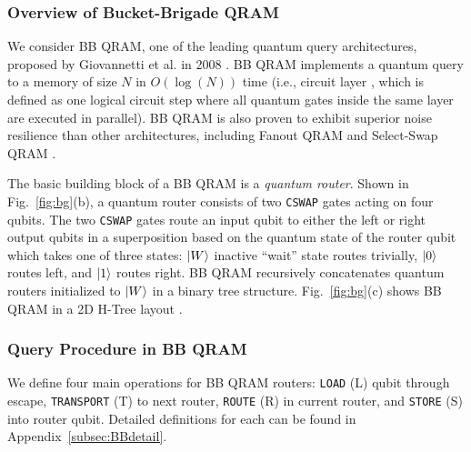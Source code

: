 \subsubsection{Overview of Bucket-Brigade QRAM}

We consider BB QRAM, one of the leading quantum query architectures, proposed by Giovannetti et al. in 2008 \cite{giovannetti2008quantum, giovannetti2008architectures}. BB QRAM implements a quantum query to a memory of size $N$ in $O(\log(N))$ time (i.e., circuit layer \cite{amico2023defining}, which is defined as one logical circuit step where all quantum gates inside the same
layer are executed in parallel). BB QRAM is also proven to exhibit superior noise resilience than other architectures, including Fanout QRAM \cite{nielsen2010quantum} and Select-Swap QRAM \cite{low2024trading}.  

The basic building block of a BB QRAM is a \emph{quantum router}. Shown in Fig.~\ref{fig:bg}(b), a quantum router consists of two \texttt{CSWAP} gates acting on four qubits. The two \texttt{CSWAP} gates route an input qubit to either the left or right output qubits in a superposition based on the quantum state of the router qubit which takes one of three states: $\ket{W}$ inactive ``wait'' state routes trivially, $\ket{0}$ routes left, and $\ket{1}$ routes right. BB QRAM recursively concatenates quantum routers initialized to $\ket{W}$ in a binary tree structure. Fig.~\ref{fig:bg}(c) shows BB QRAM in a 2D H-Tree layout \cite{giovannetti2008architectures, xu2023systems}.

\subsubsection{Query Procedure in BB QRAM}

We define four main operations for BB QRAM routers: \texttt{LOAD} (L) qubit through escape, \texttt{TRANSPORT} (T) to next router, \texttt{ROUTE} (R) in current router, and \texttt{STORE} (S) into router qubit. Detailed definitions for each can be found in Appendix~\ref{subsec:BBdetail}.

